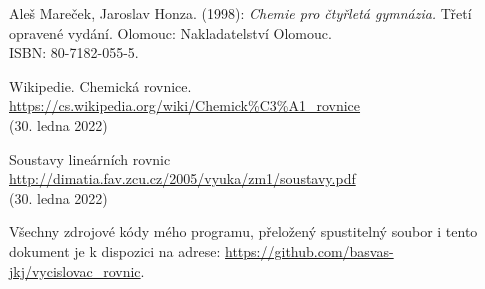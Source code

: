\documentclass[12pt,a4paper]{report}
\begin{document}
\begin{thebibliography}{99}

Aleš Mareček, Jaroslav Honza. (1998): \textit{Chemie pro čtyřletá gymnázia.} Třetí opravené vydání. Olomouc: Nakladatelství Olomouc.\\
ISBN: 80-7182-055-5.

Wikipedie. Chemická rovnice.\\
\url{https://cs.wikipedia.org/wiki/Chemick\%C3\%A1_rovnice}\\
(30. ledna 2022)

Soustavy lineárních rovnic\\
\url{http://dimatia.fav.zcu.cz/2005/vyuka/zm1/soustavy.pdf}\\
(30. ledna 2022)
\end{thebibliography}

Všechny zdrojové kódy mého programu, přeložený spustitelný soubor i tento dokument je k dispozici na adrese: \url{https://github.com/basvas-jkj/vycislovac_rovnic}.
\end{document}
